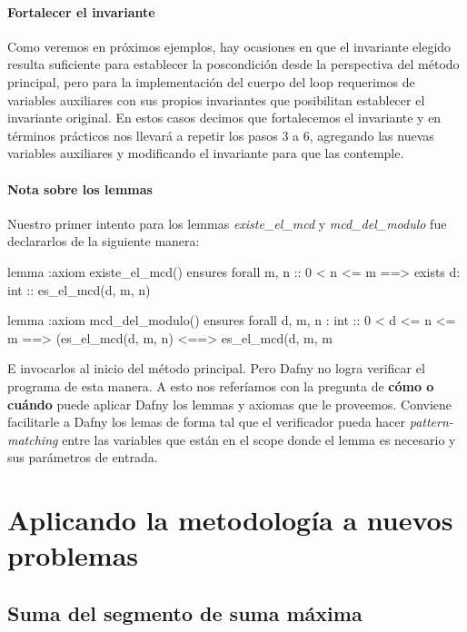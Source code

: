 \documentclass[12pt, a4paper, openany, fleqn]{book}
\begin{document}

    \subsubsection{Fortalecer el invariante}
    Como veremos en próximos ejemplos, hay ocasiones en que el invariante elegido resulta suficiente para establecer la poscondición desde la perspectiva del método principal, pero para la implementación del cuerpo del loop requerimos de variables auxiliares con sus propios invariantes que posibilitan establecer el invariante original.
    En estos casos decimos que fortalecemos el invariante y en términos prácticos nos llevará a repetir los pasos 3 a 6, agregando las nuevas variables auxiliares y modificando el invariante para que las contemple.

    \subsubsection{Nota sobre los lemmas}
    Nuestro primer intento para los lemmas \textit{existe\_el\_mcd} y \textit{mcd\_del\_modulo} fue declararlos de la siguiente manera:

    \begin{dafny}
lemma {:axiom} existe_el_mcd()
    ensures forall m, n :: 0 < n <= m ==>
        exists d: int :: es_el_mcd(d, m, n)

lemma {:axiom} mcd_del_modulo()
    ensures forall d, m, n : int :: 0 < d <= n <= m ==>
        (es_el_mcd(d, m, n) <==> es_el_mcd(d, m, m %
    \end{dafny}

    E invocarlos al inicio del método principal. Pero Dafny no logra verificar el programa de esta manera. A esto nos referíamos con la pregunta de \textbf{cómo o cuándo} puede aplicar Dafny los lemmas y axiomas que le proveemos. Conviene facilitarle a Dafny los lemas de forma tal que el verificador pueda hacer \textit{pattern-matching} entre las variables que están en el scope donde el lemma es necesario y sus parámetros de entrada.

    \chapter{Aplicando la metodología a nuevos problemas}

    \section{Suma del segmento de suma máxima}
\end{document}
